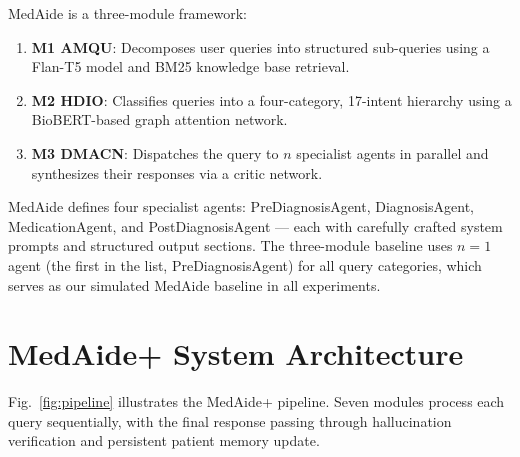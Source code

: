 \documentclass[conference]{IEEEtran}
\begin{document}
MedAide \cite{mediaide2024} is a three-module framework:
\begin{enumerate}
  \item \textbf{M1 AMQU}: Decomposes user queries into structured sub-queries using
    a Flan-T5 model and BM25 knowledge base retrieval.
  \item \textbf{M2 HDIO}: Classifies queries into a four-category, 17-intent hierarchy
    using a BioBERT-based graph attention network.
  \item \textbf{M3 DMACN}: Dispatches the query to $n$ specialist agents in parallel
    and synthesizes their responses via a critic network.
\end{enumerate}

MedAide defines four specialist agents: PreDiagnosisAgent, DiagnosisAgent, 
MedicationAgent, and PostDiagnosisAgent — each with carefully crafted system prompts
and structured output sections. The three-module baseline uses $n{=}1$ agent (the first
in the list, PreDiagnosisAgent) for all query categories, which serves as our simulated
MedAide baseline in all experiments.

\section{MedAide+ System Architecture}
\label{sec:architecture}

Fig.~\ref{fig:pipeline} illustrates the MedAide+ pipeline. Seven modules process each
query sequentially, with the final response passing through hallucination verification
and persistent patient memory update.
\end{document}
